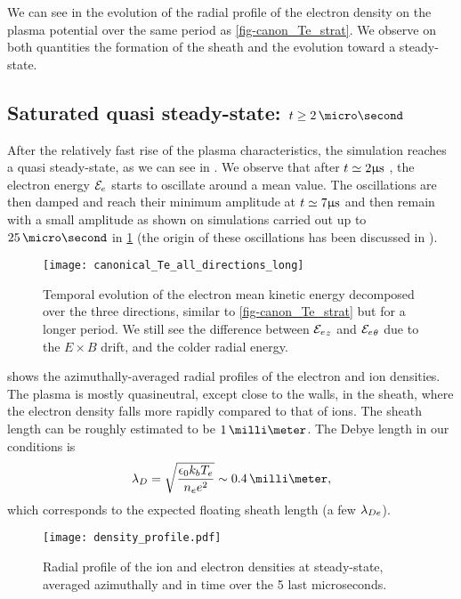   We can see in  the evolution of the radial profile of the electron density on the plasma potential over the same period as \cref{fig-canon_Te_strat}.
  We observe on both quantities the formation of the sheath and the evolution toward a steady-state.
  
  \subsection{Saturated quasi steady-state\string: \texorpdfstring{$t \geq 2\,\micro\second$}{t > 2 microseconds}  }
  \label{subsec-stablephase}
  After the relatively fast rise of the plasma characteristics, the simulation reaches a quasi steady-state, as we can see in .
  We observe that after $t\simeq2\mathrm{\upmu s}$ , the electron energy ${\mathcal{E}_e}$ starts to oscillate around a mean value.
  The oscillations are then damped and reach their minimum amplitude at  $t\simeq 7\mathrm{\upmu s}$ and then remain with a small amplitude as shown on simulations carried out up to $25\,\micro\second$ in \cref{fig-canon_Te_all} (the origin of these oscillations has been discussed in ).  
  
  
  \begin{figure}[hbt]
    \centering
    \texttt{[image: canonical\_Te\_all\_directions\_long]}
    \caption{Temporal evolution of the electron mean kinetic energy decomposed over the three directions, similar to \cref{fig-canon_Te_strat} but for a longer period. We still see the difference between ${\mathcal{E}_e}_z$ and ${\mathcal{E}_e}_{\theta}$ due to the $E\times B$ drift, and the colder radial energy.}
    \label{fig-canon_Te_all}
  \end{figure}
  

   shows the azimuthally-averaged radial profiles of the electron and ion densities.
  The plasma is mostly quasineutral, except close to the walls, in the sheath, where the electron density falls more rapidly compared to that of ions.
  The sheath length can be roughly estimated to be $1\,\milli\meter$.
  The Debye length in our conditions is
  \begin{equation} \label{eq-debye}
    \lambda_D = \sqrt{\frac{\epsilon_0 k_b T_e}{n_e e^2}} \sim 0.4\,\milli\meter,
  \end{equation}
  which corresponds to the expected floating sheath length \citep{chabert2014} (a few $\lambda_{De}$).
  
  \begin{figure}[hbt]
    \centering
    \texttt{[image: density\_profile.pdf]}
    \caption{Radial profile of the ion and electron densities at steady-state, averaged azimuthally and in time over the 5 last microseconds.}
    \label{fig-profiles}
  \end{figure}
  
